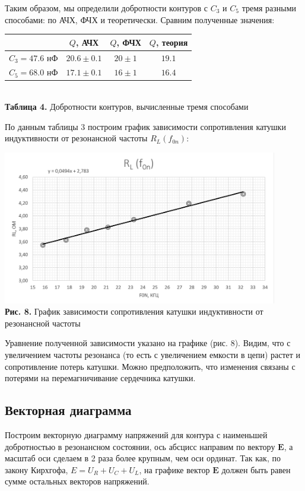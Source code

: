 \documentclass[a4paper,12pt]{article} %
\begin{document}
\hfill \break Таким образом, мы определили добротности контуров с $C_{3}$ и $C_{5}$ тремя разными способами: по АЧХ, ФЧХ и теоретически. Сравним полученные значения:

\begin{center}
    \begin{tabular}{|c|c|c|c|}
        \hline
        $ $ & $Q$, АЧХ & $Q$, ФЧХ & $Q$, теория \\\hline
        $C_{3} = 47.6$ нФ & $20.6 \pm 0.1$ & $20 \pm 1$ & $19.1$ \\\hline
        $C_{5} = 68.0$ нФ & $17.1 \pm 0.1$ & $16 \pm 1$ & $16.4$ \\\hline
    \end{tabular}\\
 \hfill \break \textbf {Таблица 4.} Добротности контуров, вычисленные тремя способами \\
\end{center}

\hfill \break По данным таблицы 3 построим график зависимости сопротивления катушки индуктивности от резонансной частоты $R_{L} (f_{0n})$:

\begin{center}
\includegraphics[width=0.90\textwidth]{3.2.2_8.png}\\
\textbf{Рис. 8.} График зависимости сопротивления катушки индуктивности от резонансной частоты\\
\end{center}

\hfill \break Уравнение полученной зависимости указано на графике (рис. 8). Видим, что с увеличением частоты резонанса (то есть с увеличением емкости в цепи) растет и сопротивление потерь катушки. Можно предположить, что изменения связаны с потерями на перемагничивание сердечника катушки.  

\subsection{Векторная диаграмма}
\hfill \break Построим векторную диаграмму напряжений для контура с наименьшей добротностью в резонансном состоянии, ось абсцисс направим по вектору $\textbf{E}$, а масштаб оси сделаем в 2 раза более крупным, чем оси ординат. Так как, по закону Кирхгофа, $E = U_{R} + U_{C} + U_{L}$, на графике вектор $\textbf{E}$ должен быть равен сумме остальных векторов напряжений. 
\end{document}
